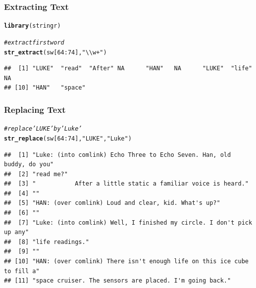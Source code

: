 \documentclass[12pt]{beamer}\usepackage[]{graphicx}\usepackage[]{color}
\makeatletter
\newcommand{\hlnum}[1]{\textcolor[rgb]{0.686,0.059,0.569}{#1}}%
\newcommand{\hlstr}[1]{\textcolor[rgb]{0.192,0.494,0.8}{#1}}%
\newcommand{\hlcom}[1]{\textcolor[rgb]{0.678,0.584,0.686}{\textit{#1}}}%
\newcommand{\hlopt}[1]{\textcolor[rgb]{0,0,0}{#1}}%
\newcommand{\hlstd}[1]{\textcolor[rgb]{0.345,0.345,0.345}{#1}}%
\newcommand{\hlkwd}[1]{\textcolor[rgb]{0.737,0.353,0.396}{\textbf{#1}}}%
\newenvironment{kframe}{%
 \def\at@end@of@kframe{}%
 \ifinner\ifhmode%
  \def\at@end@of@kframe{\end{minipage}}%
  \begin{minipage}{\columnwidth}%
 \fi\fi%
 \def\FrameCommand##1{\hskip\@totalleftmargin \hskip-\fboxsep
 \colorbox{shadecolor}{##1}\hskip-\fboxsep
     \hskip-\linewidth \hskip-\@totalleftmargin \hskip\columnwidth}%
 \MakeFramed {\advance\hsize-\width
   \@totalleftmargin\z@ \linewidth\hsize
   \@setminipage}}%
 {\par\unskip\endMakeFramed%
 \at@end@of@kframe}
\newenvironment{knitrout}{}{} %
\makeatother
\begin{document}
\begin{frame}[fragile]
\frametitle{Extracting Text}

\begin{knitrout}\scriptsize
{}\color{fgcolor}\begin{kframe}
\begin{alltt}
\hlkwd{library}\hlstd{(stringr)}

\hlcom{# extract first word}
\hlkwd{str_extract}\hlstd{(sw[}\hlnum{64}\hlopt{:}\hlnum{74}\hlstd{],} \hlstr{"\textbackslash{}\textbackslash{}w+"}\hlstd{)}
\end{alltt}
\begin{verbatim}
##  [1] "LUKE"  "read"  "After" NA      "HAN"   NA      "LUKE"  "life"  NA     
## [10] "HAN"   "space"
\end{verbatim}
\end{kframe}
\end{knitrout}

\end{frame}


\begin{frame}[fragile]
\frametitle{Replacing Text}

\begin{knitrout}\tiny
{}\color{fgcolor}\begin{kframe}
\begin{alltt}
\hlcom{# replace 'LUKE' by 'Luke'}
\hlkwd{str_replace}\hlstd{(sw[}\hlnum{64}\hlopt{:}\hlnum{74}\hlstd{],} \hlstr{"LUKE"}\hlstd{,} \hlstr{"Luke"}\hlstd{)}
\end{alltt}
\begin{verbatim}
##  [1] "Luke: (into comlink) Echo Three to Echo Seven. Han, old buddy, do you" 
##  [2] "read me?"                                                              
##  [3] "           After a little static a familiar voice is heard."           
##  [4] ""                                                                      
##  [5] "HAN: (over comlink) Loud and clear, kid. What's up?"                   
##  [6] ""                                                                      
##  [7] "Luke: (into comlink) Well, I finished my circle. I don't pick up any"  
##  [8] "life readings."                                                        
##  [9] ""                                                                      
## [10] "HAN: (over comlink) There isn't enough life on this ice cube to fill a"
## [11] "space cruiser. The sensors are placed. I'm going back."
\end{verbatim}
\end{kframe}
\end{knitrout}

\end{frame}
\end{document}
